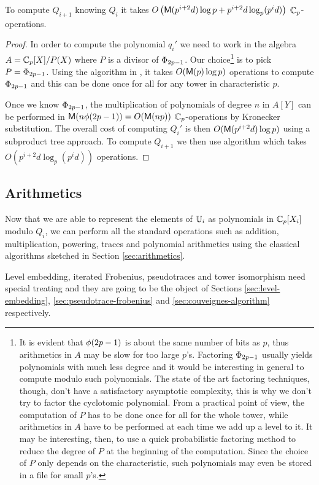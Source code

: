 \begin{theorem}
  To compute $Q_{i+1}$ knowing $Q_i$ it takes $O\left(\mathrm{\sf M}(p^{i+2}d)\log p
  + p^{i+2}d\log_p(p^id)\right)$ $\mathbb{C}_p$-operations.
\end{theorem}
\begin{proof}
  In order to compute the polynomial $q_i'$ we need to work in the
  algebra $A=\mathbb{C}_p[X]/P(X)$ where $P$ is a divisor of
  $\Phi_{2p-1}$. Our choice\footnote{It is evident that
    $\phi(2p-1)$ is about the same number of bits as $p$, thus
    arithmetics in $A$ may be slow for too large $p$'s. Factoring
    $\Phi_{2p-1}$ usually yields polynomials with much less degree
    and it would be interesting in general to compute modulo such
    polynomials. The state of the art factoring techniques, though,
    don't have a satisfactory asymptotic complexity, this is why we
    don't try to factor the cyclotomic polynomial. From a practical
    point of view, the computation of $P$ has to be done once for all
    for the whole tower, while arithmetics in $A$ have to be performed
    at each time we add up a level to it. It may be interesting, then,
    to use a quick probabilistic factoring method to reduce the degree
    of $P$ at the beginning of the computation. Since the choice of
    $P$ only depends on the characteristic, such polynomials may even
    be stored in a file for small $p$'s.} is to pick
  $P=\Phi_{2p-1}$. Using the algorithm in \cite{}, it takes
  $O(\mathrm{\sf M}(p)\log p)$ operations to compute $\Phi_{2p-1}$ and this
  can be done once for all for any tower in characteristic $p$.
  
  Once we know $\Phi_{2p-1}$, the multiplication of polynomials of
  degree $n$ in $A[Y]$ can be performed in $\mathrm{\sf M}(n\phi(2p-1)) =
  O(\mathrm{\sf M}(np))$ $\mathbb{C}_p$-operations by Kronecker substitution. The
  overall cost of computing $Q_i'$ is then $O(\mathrm{\sf M}(p^{i+2}d)\log p)$
  using a subproduct tree approach. To compute $Q_{i+1}$ we then use
  algorithm  which takes $O(p^{i+2}d\log_p(p^id))$
  operations.
\end{proof}

\subsection{Arithmetics}
Now that we are able to represent the elements of $\mathbb{U}_i$ as
polynomials in $\mathbb{C}_p[X_i]$ modulo $Q_i$, we can perform all the
standard operations such as addition, multiplication, powering, traces
and polynomial arithmetics using the classical algorithms sketched in
Section \ref{sec:arithmetics}.

Level embedding, iterated Frobenius, pseudotraces and tower
isomorphism need special treating and they are going to be the object
of Sections \ref{sec:level-embedding}, \ref{sec:pseudotrace-frobenius} and
\ref{sec:couveignes-algorithm} respectively.




%
